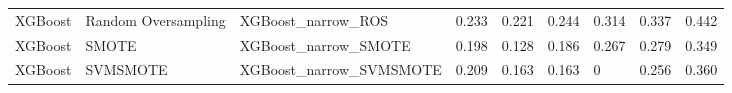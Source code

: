 \begin{tabular}{lllllllll}
                     XGBoost & Random Oversampling &                           XGBoost\_narrow\_ROS & 0.233 &                     0.221 &                 0.244 &                  0.314 &                                   0.337 &     0.442 \\
                     XGBoost &               SMOTE &                         XGBoost\_narrow\_SMOTE & 0.198 &                     0.128 &                 0.186 &                  0.267 &                                   0.279 &     0.349 \\
                     XGBoost &            SVMSMOTE &                      XGBoost\_narrow\_SVMSMOTE & 0.209 &                     0.163 &                 0.163 &                      0 &                                   0.256 &     0.360 \\
\bottomrule
\end{tabular}
